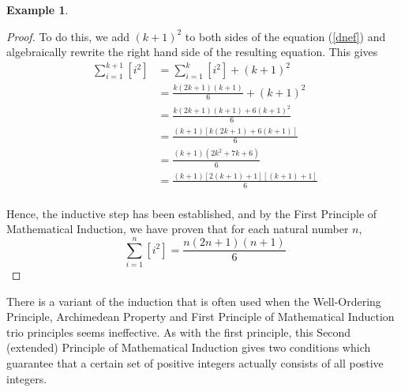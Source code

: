 \documentclass{book}
\theoremstyle{definition}
\newtheorem{example}{Example}[definition]
\theoremstyle{remark}
\begin{document}
\begin{example}
\begin{proof}
        To do this, we add $(k+1)^2$ to both sides of the equation (\ref{dnef}) and algebraically rewrite the right hand side of the resulting equation. This gives
            \begin{align*}
                \sum_{i=1}^{k+1}{[i^2]} & = \sum_{i=1}^{k}{[i^2]} + (k+1)^2 \\
                    & = \frac{k(2k+1)(k+1)}{6} + (k+1)^2 \\
                    & = \frac{k(2k+1)(k+1) + 6(k+1)^2}{6} \\
                    & = \frac{(k+1)[k(2k+1)+6(k+1)]}{6} \\
                    & = \frac{(k+1)(2k^2 + 7k + 6)}{6} \\
                    & = \frac{(k+1)[2(k+1)+1][(k+1)+1]}{6} \\
            \end{align*}
        
        Hence, the inductive step has been established, and by the First Principle of Mathematical Induction, we have proven that for each natural number $n$,
            \begin{equation*}
                \sum_{i=1}^{n}{[i^2]} = \frac{n(2n+1)(n+1)}{6}
            \end{equation*}
    \end{proof}
\end{example}


\newpage
There is a variant of the induction that is often used when the Well-Ordering Principle, Archimedean Property and First Principle of Mathematical Induction trio principles seems ineffective. As with the first principle, this Second (extended) Principle of Mathematical Induction gives two conditions which guarantee that a certain set of positive integers actually consists of all postive integers. 
\end{document}

